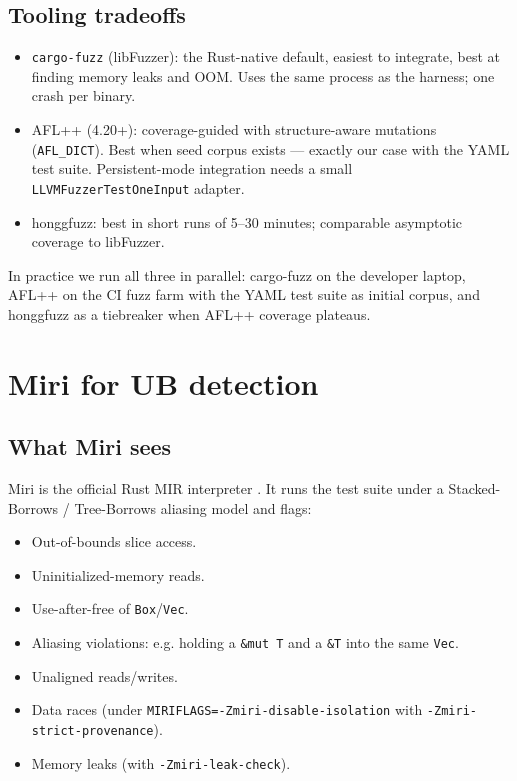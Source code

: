 \documentclass[12pt]{article}
\theoremstyle{definition}
\theoremstyle{remark}
\begin{document}
\subsection{Tooling tradeoffs}

\begin{itemize}
\item \texttt{cargo-fuzz} (libFuzzer): the Rust-native default, easiest
to integrate, best at finding memory leaks and OOM. Uses the same
process as the harness; one crash per binary.
\item AFL++ (4.20+): coverage-guided with structure-aware mutations
(\texttt{AFL\_DICT}). Best when seed corpus exists --- exactly our
case with the YAML test suite. Persistent-mode integration needs a
small \texttt{LLVMFuzzerTestOneInput} adapter.
\item honggfuzz: best in short runs of 5--30 minutes; comparable
asymptotic coverage to libFuzzer.
\end{itemize}

In practice we run all three in parallel: cargo-fuzz on the developer
laptop, AFL++ on the CI fuzz farm with the YAML test suite as initial
corpus, and honggfuzz as a tiebreaker when AFL++ coverage plateaus.

\section{Miri for UB detection}
\label{sec:miri}

\subsection{What Miri sees}

Miri is the official Rust MIR interpreter \cite{jung2026miri}. It runs
the test suite under a Stacked-Borrows / Tree-Borrows aliasing model
and flags:
\begin{itemize}
\item Out-of-bounds slice access.
\item Uninitialized-memory reads.
\item Use-after-free of \texttt{Box}/\texttt{Vec}.
\item Aliasing violations: e.g. holding a \texttt{\&mut T} and a
  \texttt{\&T} into the same \texttt{Vec}.
\item Unaligned reads/writes.
\item Data races (under \texttt{MIRIFLAGS=-Zmiri-disable-isolation}
  with \texttt{-Zmiri-strict-provenance}).
\item Memory leaks (with \texttt{-Zmiri-leak-check}).
\end{itemize}
\end{document}
